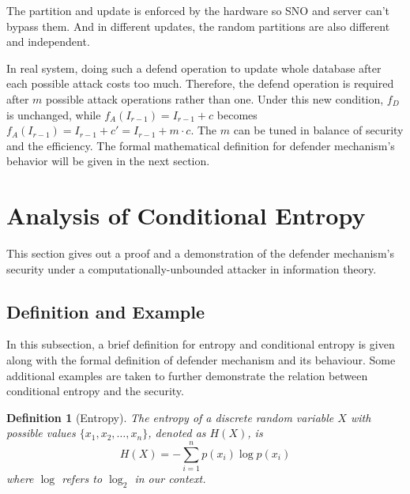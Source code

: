 \documentclass[10pt, conference, compsocconf]{IEEEtran}
\newtheorem{mydef}{Definition}
\begin{document}
        The partition and update is enforced by the hardware so SNO
        and server can't bypass them. And in
        different updates, the random partitions are also different
        and independent.


        In real system, doing such a defend operation to update whole
        database after each possible attack costs too much.
        Therefore, the defend operation is required after $m$
        possible attack operations rather than one. Under this
        new condition, $f_D$ is unchanged, while $f_A(I_{r-1}) = I_{r-1}+c$
        becomes $f_A(I_{r-1}) = I_{r-1}+c' = I_{r-1}+m \cdot c$.
        The $m$ can be tuned in balance of security and the
        efficiency. The formal mathematical definition for
        defender mechanism's behavior will be given in the
        next section.

\section{Analysis of Conditional Entropy}\label{sec_proof}
    This section gives out a proof
    and a demonstration
    of the defender mechanism's security under a computationally-unbounded attacker
    in information theory.

    \subsection{Definition and Example}
        In this subsection, a brief definition for entropy and conditional
        entropy is given along with the formal definition of defender mechanism
        and its behaviour.
        Some additional examples are taken to further
        demonstrate the relation between conditional entropy and
        the security.

        \begin{mydef}[Entropy\cite{entropy}]\label{def_entropy}
            The entropy of a discrete random variable $X$ with
            possible values $\{x_1, x_2, \ldots, x_n\}$, denoted as  $H(X)$, is
            \begin{equation}
                H(X) = -\sum_{i=1}^n p(x_i)\log p(x_i)
            \end{equation}
            where $\log$ refers to $\log_2$ in our context.
        \end{mydef}
\end{document}
